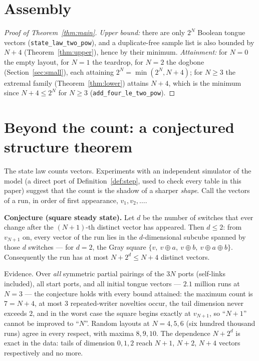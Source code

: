 \documentclass[11pt]{article}
\theoremstyle{definition}
\newcommand{\lean}[1]{\texttt{#1}}
\begin{document}
\clearpage
\section{Assembly}\label{sec:assembly}

\begin{proof}[Proof of Theorem~\ref{thm:main}]\sloppy
  \emph{Upper bound:} there are only $2^N$ Boolean tongue vectors
  (\lean{state\_law\_two\_pow}), and a duplicate-free sample list is
  also bounded by $N+4$ (Theorem~\ref{thm:upper}), hence by their minimum.
  \emph{Attainment:} for $N = 0$ the empty layout, for $N = 1$ the
  teardrop, for $N = 2$ the dogbone (Section~\ref{sec:small}), each
  attaining $2^N = \min(2^N, N+4)$; for $N \ge 3$ the extremal family
  (Theorem~\ref{thm:lower}) attains $N+4$, which is the minimum since
  $N+4 \le 2^N$ for $N \ge 3$ (\lean{add\_four\_le\_two\_pow}).
\end{proof}

\section{Beyond the count: a conjectured structure theorem}
\label{sec:structure}

The state law counts vectors.  Experiments with an independent simulator
of the model (a direct port of Definition~\ref{def:step}, used to check
every table in this paper) suggest that the count is the shadow of a
sharper \emph{shape}.  Call the vectors of a run, in order of first
appearance, $v_1, v_2, \dots$.

\begin{center}
\begin{minipage}{0.92\textwidth}
  \textbf{Conjecture (square steady state).}  Let $d$ be the number of
  switches that ever change after the $(N{+}1)$-th distinct vector has
  appeared.  Then $d \le 2$: from $v_{N+1}$ on, every vector of the run
  lies in the $d$-dimensional subcube spanned by those $d$ switches ---
  for $d = 2$, the Gray square $\{v,\ v\oplus a,\ v\oplus b,\
  v\oplus a\oplus b\}$.  Consequently the run has at most $N + 2^d \le
  N + 4$ distinct vectors.
\end{minipage}
\end{center}

Evidence.  Over \emph{all} symmetric partial pairings of the $3N$ ports
(self-links included), all start ports, and all initial tongue vectors ---
$2.1$ million runs at $N = 3$ --- the conjecture holds with every bound
attained: the maximum count is $7 = N+4$, at most $3$ repeated-writer
novelties occur, the tail dimension never exceeds $2$, and in the worst
case the square begins exactly at $v_{N+1}$, so ``$N+1$'' cannot be
improved to ``$N$''.  Random layouts at $N = 4, 5, 6$ (six hundred
thousand runs) agree in every respect, with maxima $8, 9, 10$.  The
dependence $N + 2^d$ is exact in the data: tails of dimension $0, 1, 2$
reach $N+1$, $N+2$, $N+4$ vectors respectively and no more.
\end{document}
